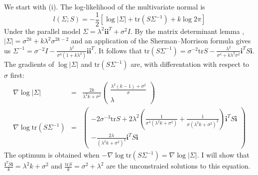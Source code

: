 \documentclass{article}
\makeatletter
\theoremstyle{plain}
\theoremstyle{plain}
\theoremstyle{definition}
\theoremstyle{remark}
\theoremstyle{definition}
\theoremstyle{plain}
\theoremstyle{plain}
\theoremstyle{definition}
\newenvironment{proof}[1][\protect\proofname]{\par
	\normalfont\topsep6\p@\@plus6\p@\relax
	\trivlist
	\itemindent\parindent
	\item[\hskip\labelsep\scshape #1]\ignorespaces
}{%
	\endtrivlist\@endpefalse
}
\providecommand{\proofname}{Proof}
\makeatother
\begin{document}
\begin{proof}[Proof of Theorem \ref{thm:ML}]\label{proof:ML}
We start with (i). The log-likelihood of the multivariate normal is
\begin{equation}
l\left(\Sigma;S\right)=-\frac{1}{2}\left[\log\left|\Sigma\right|+\textrm{tr}\left(S\Sigma^{-1}\right)+k\log2\pi\right]
\end{equation}
Under the parallel model $\Sigma=\lambda^{2}\mathbf{i}\mathbf{i}^{T}+\sigma^{2}I$.
By the matrix determinant lemma \citep[][Theorem 18.1.1 (p. 416)]{Harville2008-el}, $\left|\Sigma\right|=\sigma^{2k}+k\lambda^{2}\sigma^{2k-2}$
and an application of the Sherman--Morrison formula \citep{shermanmorrison}
gives us $\Sigma^{-1}=\sigma^{-2}I-\frac{\lambda^{2}}{\sigma^{4}\left(1+k\lambda^{2}\right)}\mathbf{i}\mathbf{i}^{T}$.
It follows that $\textrm{tr}\left(S\Sigma^{-1}\right)=\sigma^{-2}\textrm{tr}S-\frac{\lambda^{2}}{\sigma^{4}+k\lambda^{2}\sigma^{2}}\mathbf{i}^{T}S\mathbf{i}$.
The gradients of $\log\left|\Sigma\right|$ and $\textrm{tr}\left(S\Sigma^{-1}\right)$
are, with differentation with respect to $\sigma$ first:
\begin{eqnarray}
\nabla\log\left|\Sigma\right| & = & \frac{2k}{\lambda^{2}k+\sigma^{2}}\left(\begin{array}{c}
\frac{\lambda^{2}\left(k-1\right)+\sigma^{2}}{\sigma}\\
\lambda
\end{array}\right)\\
\nabla\log\textrm{tr}\left(S\Sigma^{-1}\right) & = & \left(\begin{array}{c}
-2\sigma^{-3}\textrm{tr}S+2\lambda^{2}\left(\frac{1}{\sigma^{3}\left(\lambda^{2}k+\sigma^{2}\right)}+\frac{1}{\sigma\left(\lambda^{2}k+\sigma^{2}\right)^{2}}\right)\mathbf{i}^{T}S\mathbf{i}\\
-\frac{2\lambda}{\left(\lambda^{2}k+\sigma^{2}\right)^{2}}\mathbf{i}^{T}S\mathbf{i}
\end{array}\right)\nonumber 
\end{eqnarray}
The optimum is obtained when $-\nabla\log\textrm{tr}\left(S\Sigma^{-1}\right)=\nabla\log\left|\Sigma\right|$.
I will show that $\frac{\mathbf{i}^{T}S\mathbf{i}}{k}=\lambda^{2}k+\sigma^{2}$
and $\frac{\textrm{tr}S}{k}=\sigma^{2}+\lambda^{2}$ are the unconstraied
solutions to this equation.


\end{proof}
\end{document}
